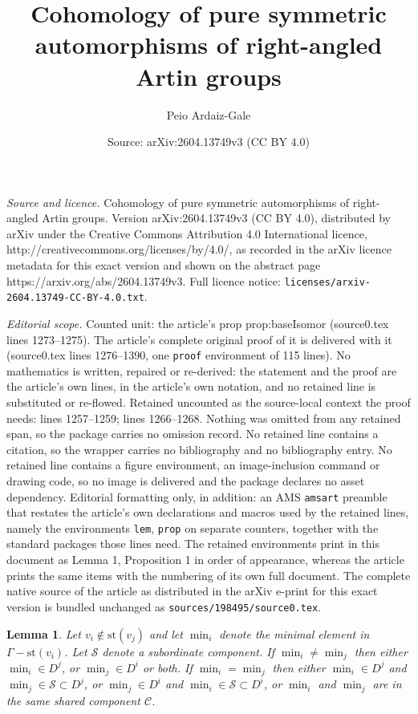 \documentclass[10pt,a4paper]{amsart}
\title{Cohomology of pure symmetric automorphisms of right-angled Artin groups}
\author{Peio Ardaiz-Gale}
\date{Source: arXiv:2604.13749v3 (CC BY 4.0)}
\newtheorem{lem}{Lemma}
\newcommand{\C}{\mathcal{C}}
\newcommand{\G}{\Gamma}
\newcommand{\st}{\mathrm{st}}
\begin{document}
\maketitle

\noindent\emph{Source and licence.} Cohomology of pure symmetric automorphisms of right-angled Artin groups. Version arXiv:2604.13749v3 (CC BY 4.0), distributed by arXiv under the Creative Commons Attribution 4.0 International licence, http://creativecommons.org/licenses/by/4.0/, as recorded in the arXiv licence metadata for this exact version and shown on the abstract page https://arxiv.org/abs/2604.13749v3. Full licence notice: \texttt{licenses/arxiv-2604.13749-CC-BY-4.0.txt}.\par\smallskip

\noindent\textit{Editorial scope.} Counted unit: the article's prop prop:baseIsomor (source0.tex lines 1273--1275). The article's complete original proof of it is delivered with it (source0.tex lines 1276--1390, one \texttt{proof} environment of 115 lines). No mathematics is written, repaired or re-derived: the statement and the proof are the article's own lines, in the article's own notation, and no retained line is substituted or re-flowed.  Retained uncounted as the source-local context the proof needs: lines 1257--1259; lines 1266--1268.  Nothing was omitted from any retained span, so the package carries no omission record.  No retained line contains a citation, so the wrapper carries no bibliography and no bibliography entry.  No retained line contains a figure environment, an image-inclusion command or drawing code, so no image is delivered and the package declares no asset dependency.  Editorial formatting only, in addition: an AMS \texttt{amsart} preamble that restates the article's own declarations and macros used by the retained lines, namely the environments \texttt{lem}, \texttt{prop} on separate counters, together with the standard packages those lines need.  The retained environments print in this document as Lemma 1, Proposition 1 in order of appearance, whereas the article prints the same items with the numbering of its own full document.  The complete native source of the article as distributed in the arXiv e-print for this exact version is bundled unchanged as \texttt{sources/198495/source0.tex}.
\begin{lem}\label{lem:minimal-component}
    Let $v_i\notin\st(v_j)$ and let $\min_i$ denote the minimal element in $\G-\st(v_i)$. Let $\mathcal{S}$ denote a subordinate component.  If $\min_i\neq\min_j$ then either $\min_i\in D^j$, or $\min_j\in D^i$ or both. If  $\min_i=\min_j$ then either $\min_i\in D^j$ and $\min_j\in \mathcal{S}\subset D^j$,  or $\min_j\in D^i$ and $\min_i\in \mathcal{S}\subset D^i$,  or $\min_i$ and $\min_j$ are in the same shared component $\C$.
\end{lem}
\end{document}
